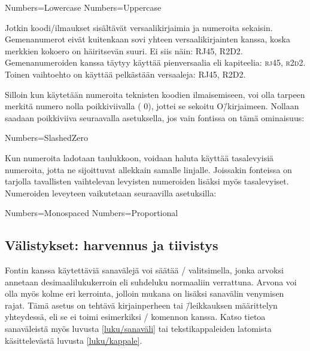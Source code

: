 \begin{koodilohkosis}
Numbers=Lowercase %
Numbers=Uppercase %
\end{koodilohkosis}

\noindent
Jotkin koodi\-/ilmaukset sisältävät versaalikirjaimia ja numeroita
sekaisin. Gemenanumerot eivät kuitenkaan sovi yhteen versaalikirjainten
kanssa, koska merkkien kokoero on häiritsevän suuri. Ei siis näin:
RJ45, R2D2. Gemenanumeroiden kanssa täytyy käyttää pienversaalia eli
kapiteelia: \textsc{rj45}, \textsc{r2d2}. Toinen vaihtoehto on käyttää
pelkästään versaaleja: {\versaalinum RJ45, R2D2}.

Silloin kun käytetään numeroita teknisten koodien ilmaisemiseen, voi
olla tarpeen merkitä numero nolla poikkiviivalla
({ 0}), jottei se
sekoitu O\=/kirjaimeen. Nollaan saadaan poikkiviiva seuraavalla
asetuksella, jos vain fontissa on tämä ominaisuus:

\begin{koodilohkosis}
Numbers=SlashedZero
\end{koodilohkosis}

\noindent
Kun numeroita ladotaan taulukkoon, voidaan haluta käyttää tasalevyisiä
numeroita, jotta ne sijoittuvat allekkain samalle linjalle. Joissakin
fonteissa on tarjolla tavallisten vaihtelevan levyisten numeroiden
lisäksi myös tasalevyiset. Numeroiden leveyteen vaikutetaan seuraavilla
asetuksilla:

\begin{koodilohkosis}
Numbers=Monospaced   %
Numbers=Proportional %
\end{koodilohkosis}

\subsection{Välistykset: harvennus ja tiivistys}
\label{luku/fontit-välistys}

Fontin kanssa käytettäviä sanavälejä voi säätää \-/
valitsimella, jonka arvoksi annetaan desimaalilukukerroin eli suhdeluku
normaaliin verrattuna. Arvona voi olla myös kolme eri kerrointa, jolloin
mukana on lisäksi sanavälin venymisen rajat. Tämä asetus on tehtävä
kirjainperheen tai \=/leikkauksen määrittelyn yhteydessä, eli se ei
toimi esimerkiksi \-/ komennon kanssa. Katso
tietoa sanaväleistä myös luvusta \ref{luku/sanaväli} tai
tekstikappaleiden latomista käsittelevästä luvusta \ref{luku/kappale}.
\noclub[2]

